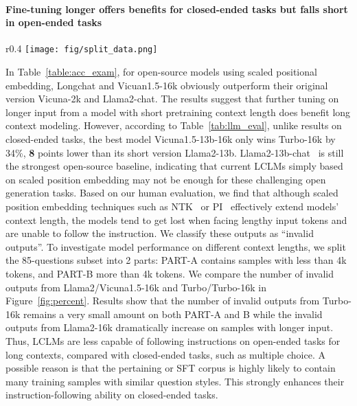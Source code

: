 \paragraph{Fine-tuning longer offers benefits for closed-ended tasks but falls short in open-ended tasks} 
\begin{wrapfigure}{r}{0.4\textwidth}
  \centering
  \vspace{-5mm}
  \texttt{[image: fig/split\_data.png]}
  \caption{Number of invalid outputs from Llama2 and Turbo.}
  \label{fig:percent}
  \vspace{-3mm}
\end{wrapfigure}
In Table~\ref{table:acc_exam}, for open-source models using scaled positional embedding, Longchat and Vicuan1.5-16k obviously outperform their original version Vicuna-2k and Llama2-chat. The results suggest that further tuning on longer input from a model with short pretraining context length does benefit long context modeling. However, according to Table~\ref{tab:llm_eval}, unlike results on closed-ended tasks, the best model Vicuna1.5-13b-16k only wins Turbo-16k by 34\%, \textbf{8} points lower than its short version Llama2-13b. Llama2-13b-chat~\citep{touvron2023llama} is still the strongest open-source baseline, indicating that current LCLMs simply based on scaled position embedding may not be enough for these challenging open generation tasks. Based on our human evaluation, we find that although scaled position embedding techniques such as NTK~\citep{fixedNTK} or PI~\citep{sun2022lengthextrapolatable} effectively extend models' context length, the models tend to get lost when facing lengthy input tokens and are unable to follow the instruction. We classify these outputs as ``invalid outputs''. 
To investigate model performance on different context lengths, we split the 85-questions subset into 2 parts: PART-A contains samples with less than 4k tokens, and PART-B more than 4k tokens. We compare the number of invalid outputs from Llama2/Vicuna1.5-16k and Turbo/Turbo-16k in Figure~\ref{fig:percent}. Results show that the number of invalid outputs from Turbo-16k remains a very small amount on both PART-A and B while the invalid outputs from Llama2-16k dramatically increase on samples with longer input. Thus, LCLMs are less capable of following instructions on open-ended tasks for long contexts, compared with closed-ended tasks, such as multiple choice. A possible reason is that the pertaining or SFT corpus is highly likely to contain many training samples with similar question styles. This strongly enhances their instruction-following ability on closed-ended tasks. 

